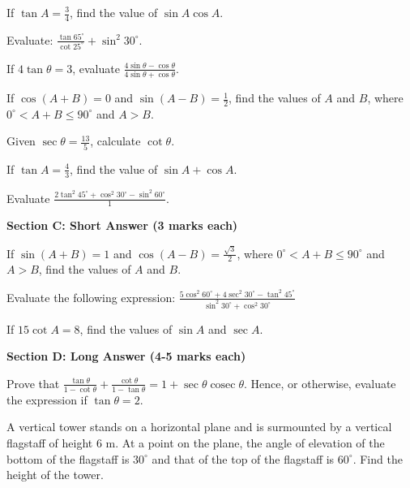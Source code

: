 \documentclass[12pt,a4paper]{exam}
\begin{document}
\begin{questions}
\question[2] If $\tan A = \frac{3}{4}$, find the value of $\sin A \cos A$.
\vspace{0.15cm}

\question[2] Evaluate: $\frac{\tan 65^\circ}{\cot 25^\circ} + \sin^2 30^\circ$.
\vspace{0.15cm}

\question[2] If $4 \tan \theta = 3$, evaluate $\frac{4 \sin \theta - \cos \theta}{4 \sin \theta + \cos \theta}$.
\vspace{0.15cm}

\question[2] If $\cos(A + B) = 0$ and $\sin(A - B) = \frac{1}{2}$, find the values of $A$ and $B$, where $0^\circ < A + B \leq 90^\circ$ and $A > B$.
\vspace{0.15cm}

\question[2] Given $\sec \theta = \frac{13}{5}$, calculate $\cot \theta$.
\vspace{0.15cm}

\question[2] If $\tan A = \frac{4}{3}$, find the value of $\sin A + \cos A$.
\vspace{0.15cm}

\question[2] Evaluate $\frac{2 \tan^2 45^\circ + \cos^2 30^\circ - \sin^2 60^\circ}{1}$.
\vspace{0.15cm}

\end{questions}
\bigskip
\noindent\textbf{\large Section C: Short Answer (3 marks each)}

\begin{questions}
\question[3] If $\sin(A + B) = 1$ and $\cos(A - B) = \frac{\sqrt{3}}{2}$, where $0^\circ < A + B \leq 90^\circ$ and $A > B$, find the values of $A$ and $B$.
\vspace{0.15cm}

\question[3] Evaluate the following expression: $\frac{5 \cos^2 60^\circ + 4 \sec^2 30^\circ - \tan^2 45^\circ}{\sin^2 30^\circ + \cos^2 30^\circ}$
\vspace{0.15cm}

\question[3] If $15 \cot A = 8$, find the values of $\sin A$ and $\sec A$.
\vspace{0.15cm}

\end{questions}
\bigskip
\noindent\textbf{\large Section D: Long Answer (4-5 marks each)}

\begin{questions}
\question[5] Prove that $\frac{\tan \theta}{1 - \cot \theta} + \frac{\cot \theta}{1 - \tan \theta} = 1 + \sec \theta \operatorname{cosec} \theta$. Hence, or otherwise, evaluate the expression if $\tan \theta = 2$.
\vspace{0.15cm}

\question[5] A vertical tower stands on a horizontal plane and is surmounted by a vertical flagstaff of height $6$ m. At a point on the plane, the angle of elevation of the bottom of the flagstaff is $30^\circ$ and that of the top of the flagstaff is $60^\circ$. Find the height of the tower.
\vspace{0.15cm}

\end{questions}
\bigskip
\end{document}
